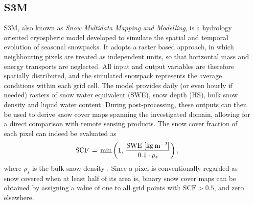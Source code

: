 \subsection{S3M}
\label{subsec:s3m}

S3M, also known as \textit{Snow Multidata Mapping and Modelling}, is a hydrology oriented cryospheric model developed to simulate the spatial and temporal 
evolution of seasonal snowpacks. It adopts a raster based approach, in which neighbouring pixels are treated as independent units, so that horizontal mass 
and energy transports are neglected. All input and output variables are therefore spatially distributed, and the simulated snowpack represents the average 
conditions within each grid cell. The model provides daily (or even hourly if needed) rasters of snow water equivalent (SWE), snow depth (HS), bulk snow 
density and liquid water content. During post-processing, these outputs can then be used to derive snow cover maps spanning the investigated 
domain, allowing for a direct comparison with remote sensing products. The snow cover fraction of each pixel can indeed be evaluated as
\begin{equation}
    \text{SCF}\,=\,\text{min}\left(1,\,\frac{\text{SWE [\SI{}{\kilo\gram\per\meter\squared}]}}{0.1 \cdot \rho_{s}}\right),
    \label{eq:scf_IT-SNOW}
\end{equation}
where $\rho_{s}$ is the bulk snow density \parencite{scf_ITSNOW}. Since a pixel is conventionally regarded as snow covered when at least half of its area 
is, binary snow cover maps can be obtained by assigning a value of one to all grid points with $\text{SCF}>0.5$, and zero elsewhere.

